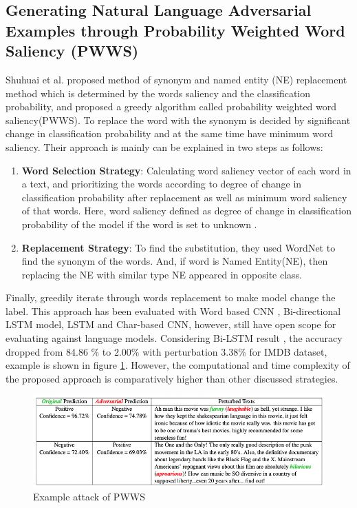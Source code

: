 \documentclass[%
	BCOR=8mm, %
	DIV=12, 
	toc=bibliography, %
	toc=listof, %
	oneside, %
	egregdoesnotlikesansseriftitles, %
	]{scrbook}
\begin{document}
\subsection{Generating Natural Language Adversarial Examples through Probability Weighted Word Saliency (PWWS)}
Shuhuai et al$.$\cite{ren_generating_2019} proposed method of synonym and named entity (NE) replacement method which is determined by the words saliency  and the classification probability, and proposed a greedy algorithm called probability weighted word saliency(PWWS). To replace the word with the synonym is decided by significant change in classification probability and at the same time have minimum word saliency. Their approach is mainly can be explained in two steps as follows:
\begin{enumerate}
\item \textbf{Word Selection Strategy}: Calculating word saliency vector of each word in a text, and prioritizing the words according to degree of change in classification probability after replacement as well as minimum word saliency of that words. Here, word saliency defined as degree of change in classification probability of the model if the word is set to unknown \cite{li_understanding_2017}.
\item \textbf{Replacement Strategy}: To find the substitution, they used WordNet to find the synonym of the words.  And, if word is Named Entity(NE), then  replacing the NE with similar type NE appeared in opposite class. 
\end{enumerate}
Finally, greedily iterate through words replacement to make model change the label. This approach has been evaluated with Word based CNN \cite{kim_convolutional_2014},  Bi-directional LSTM model, LSTM and Char-based CNN\cite{zhang_character-level_2016}, however, still have open scope for evaluating against language models. Considering Bi-LSTM result , the accuracy dropped from 84.86 \% to 2.00\%   with perturbation 3.38\% for IMDB dataset, example is shown in figure \ref{diag:pwwsexp}. However, the computational and time complexity of the proposed approach is comparatively higher than other discussed strategies.
\begin{figure}[h!]
\centering
\includegraphics[width=.9\textwidth]{img/PWWSexample.png}
\caption{Example attack of PWWS\cite{ren_generating_2019} }
\label{diag:pwwsexp}
\end{figure}
\end{document}
